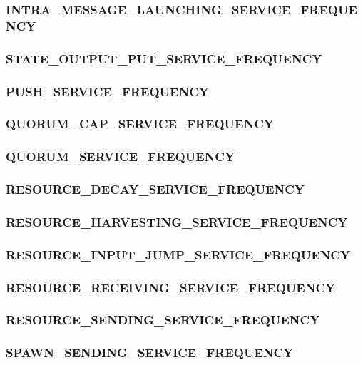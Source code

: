 \subsubsection{INTRA\_MESSAGE\_LAUNCHING\_SERVICE\_FREQUENCY}

\subsubsection{STATE\_OUTPUT\_PUT\_SERVICE\_FREQUENCY}

\subsubsection{PUSH\_SERVICE\_FREQUENCY}

\subsubsection{QUORUM\_CAP\_SERVICE\_FREQUENCY}

\subsubsection{QUORUM\_SERVICE\_FREQUENCY}

\subsubsection{RESOURCE\_DECAY\_SERVICE\_FREQUENCY}

\subsubsection{RESOURCE\_HARVESTING\_SERVICE\_FREQUENCY}

\subsubsection{RESOURCE\_INPUT\_JUMP\_SERVICE\_FREQUENCY}

\subsubsection{RESOURCE\_RECEIVING\_SERVICE\_FREQUENCY}

\subsubsection{RESOURCE\_SENDING\_SERVICE\_FREQUENCY}

\subsubsection{SPAWN\_SENDING\_SERVICE\_FREQUENCY}

